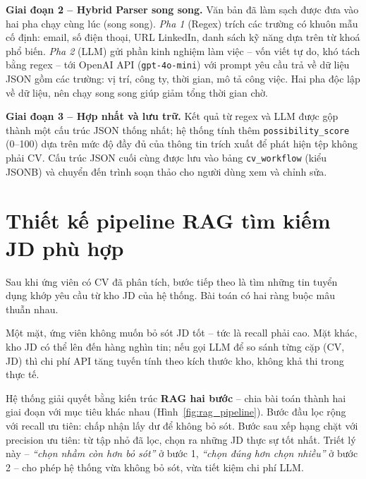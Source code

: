 \documentclass[../DoAn.tex]{subfiles}
\begin{document}
\textbf{Giai đoạn 2 -- Hybrid Parser song song.} Văn bản đã làm sạch được đưa vào hai pha chạy cùng lúc (song song). \textit{Pha 1} (Regex) trích các trường có khuôn mẫu cố định: email, số điện thoại, URL LinkedIn, danh sách kỹ năng dựa trên từ khoá phổ biến. \textit{Pha 2} (LLM) gửi phần kinh nghiệm làm việc -- vốn viết tự do, khó tách bằng regex -- tới OpenAI API (\texttt{gpt-4o-mini}) với prompt yêu cầu trả về dữ liệu JSON gồm các trường: vị trí, công ty, thời gian, mô tả công việc. Hai pha độc lập về dữ liệu, nên chạy song song giúp giảm tổng thời gian chờ.

\textbf{Giai đoạn 3 -- Hợp nhất và lưu trữ.} Kết quả từ regex và LLM được gộp thành một cấu trúc JSON thống nhất; hệ thống tính thêm \texttt{possibility\_score} (0--100) dựa trên mức độ đầy đủ của thông tin trích xuất để phát hiện tệp không phải CV. Cấu trúc JSON cuối cùng được lưu vào bảng \texttt{cv\_workflow} (kiểu JSONB) và chuyển đến trình soạn thảo cho người dùng xem và chỉnh sửa.

\section{Thiết kế pipeline RAG tìm kiếm JD phù hợp}
\label{sec:rag_design}

Sau khi ứng viên có CV đã phân tích, bước tiếp theo là tìm những tin tuyển dụng khớp yêu cầu từ kho JD của hệ thống. Bài toán có hai ràng buộc mâu thuẫn nhau.

Một mặt, ứng viên không muốn bỏ sót JD tốt -- tức là recall phải cao. Mặt khác, kho JD có thể lên đến hàng nghìn tin; nếu gọi LLM để so sánh từng cặp (CV, JD) thì chi phí API tăng tuyến tính theo kích thước kho, không khả thi trong thực tế.

Hệ thống giải quyết bằng kiến trúc \textbf{RAG hai bước} -- chia bài toán thành hai giai đoạn với mục tiêu khác nhau (Hình~\ref{fig:rag_pipeline}). Bước đầu lọc rộng với recall ưu tiên: chấp nhận lấy dư để không bỏ sót. Bước sau xếp hạng chặt với precision ưu tiên: từ tập nhỏ đã lọc, chọn ra những JD thực sự tốt nhất. Triết lý này -- \textit{``chọn nhầm còn hơn bỏ sót''} ở bước 1, \textit{``chọn đúng hơn chọn nhiều''} ở bước 2 -- cho phép hệ thống vừa không bỏ sót, vừa tiết kiệm chi phí LLM.
\end{document}
